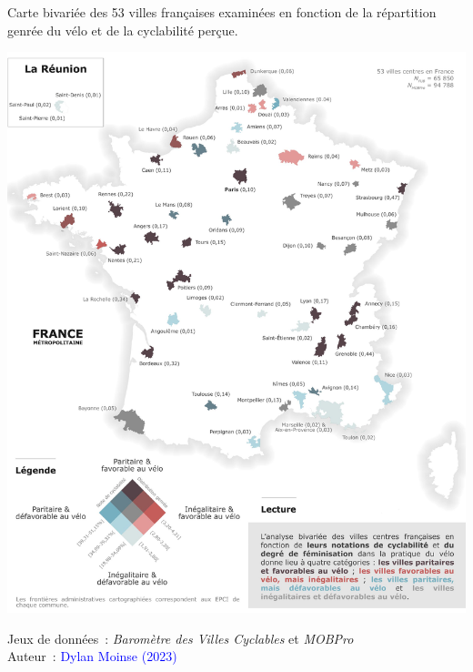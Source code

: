 \begin{refsegment}
    \begin{carte}[h!]\vspace*{4pt}
        \caption{Carte bivariée des 53 villes françaises examinées en fonction de la répartition genrée du vélo et de la cyclabilité perçue.}
        \label{fig-chap4:carte-bivariee-genre-cyclabilite}
        \centerline{\includegraphics[width=1\columnwidth]{src/Figures/Chap-4/FR_Carte_bivariee_cyclabilite_genre_OLS.jpg}}
        \vspace{5pt}
        \begin{flushright}\scriptsize{
        Jeux de données~: \textsl{Baromètre des Villes Cyclables} \textcolor{blue}{\autocite{fub_barometre_2021}} et \textsl{MOBPro} \textcolor{blue}{\autocite{insee_documentation_2023}}
        \\
        Auteur~: \textcolor{blue}{Dylan Moinse (2023)}
        }\end{flushright}
    \end{carte}


\end{refsegment}
